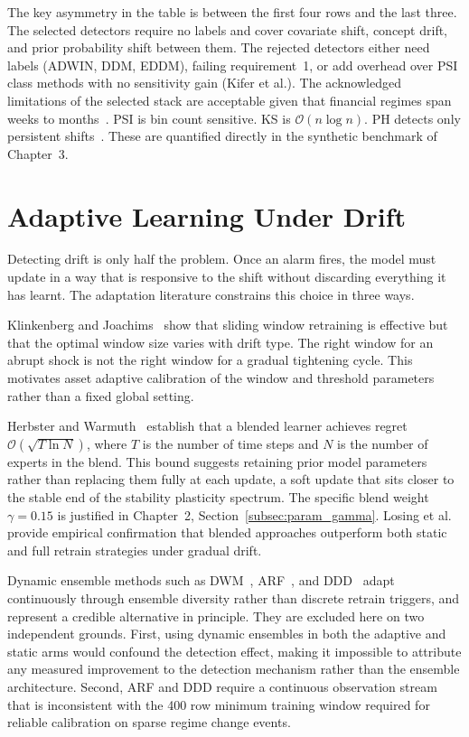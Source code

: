 The key asymmetry in the table is between the first four rows and the last three. The selected detectors require no labels and cover covariate shift, concept drift, and prior probability shift between them. The rejected detectors either need labels (ADWIN, DDM, EDDM), failing requirement~1, or add overhead over PSI class methods with no sensitivity gain (Kifer et al.). The acknowledged limitations of the selected stack are acceptable given that financial regimes span weeks to months~\cite{hamilton1989}. PSI is bin count sensitive. KS is $\mathcal{O}(n\log n)$. PH detects only persistent shifts~\cite{page1954}. These are quantified directly in the synthetic benchmark of Chapter~3.

\section{Adaptive Learning Under Drift}
\label{sec:adaptive_learning}

Detecting drift is only half the problem. Once an alarm fires, the model must update in a way that is responsive to the shift without discarding everything it has learnt. The adaptation literature constrains this choice in three ways.

Klinkenberg and Joachims~\cite{klinkenberg2000} show that sliding window retraining is effective but that the optimal window size varies with drift type. The right window for an abrupt shock is not the right window for a gradual tightening cycle. This motivates asset adaptive calibration of the window and threshold parameters rather than a fixed global setting.

Herbster and Warmuth~\cite{herbster1998} establish that a blended learner achieves regret $\mathcal{O}(\sqrt{T \ln N})$, where $T$ is the number of time steps and $N$ is the number of experts in the blend. This bound suggests retaining prior model parameters rather than replacing them fully at each update, a soft update that sits closer to the stable end of the stability plasticity spectrum. The specific blend weight $\gamma = 0.15$ is justified in Chapter~2, Section~\ref{subsec:param_gamma}. Losing et al.~\cite{losing2018} provide empirical confirmation that blended approaches outperform both static and full retrain strategies under gradual drift.

Dynamic ensemble methods such as DWM~\cite{kolter2007dwm}, ARF~\cite{gomes2017arf}, and DDD~\cite{minku2012ddd} adapt continuously through ensemble diversity rather than discrete retrain triggers, and represent a credible alternative in principle. They are excluded here on two independent grounds. First, using dynamic ensembles in both the adaptive and static arms would confound the detection effect, making it impossible to attribute any measured improvement to the detection mechanism rather than the ensemble architecture. Second, ARF and DDD require a continuous observation stream that is inconsistent with the 400 row minimum training window required for reliable calibration on sparse regime change events.

